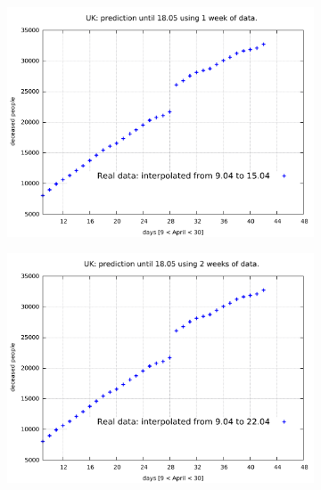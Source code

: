 \documentclass[8pt]{article}
\begin{document}
\begin{figure}[h!]
  \centering
  \begin{subfigure}[b]{0.45\linewidth}
  \includegraphics[width=\linewidth]{../tuned/uk/9-15/9-15.pdf}
  \end{subfigure}
  \begin{subfigure}[b]{0.45\linewidth}
    \includegraphics[width=\linewidth]{../tuned/uk/9-22/9-22.pdf}
  \end{subfigure}
  \begin{subfigure}[b]{0.45\linewidth}

\end{subfigure}
\end{figure}
\end{document}
